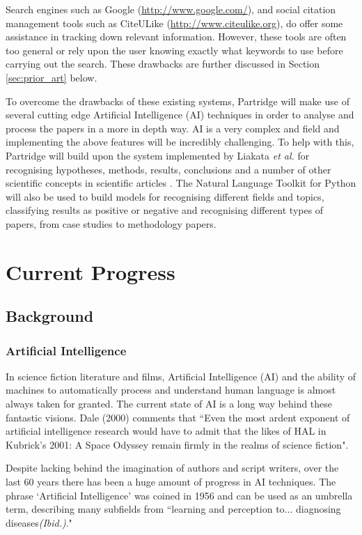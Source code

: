 \documentclass[12pt,a4paper]{article}
\begin{document}
Search engines such as Google ({\url{http://www.google.com/}}), and social
citation management tools such as CiteULike ({\url{http://www.citeulike.org}}),
do offer some assistance in tracking down relevant information. However, these
tools are often too general or rely upon the user knowing exactly what keywords
to use before carrying out the search. These drawbacks are further discussed in 
Section \ref{sec:prior_art} below.

To overcome the drawbacks of these existing systems, Partridge will make use of
several cutting edge Artificial Intelligence (AI) techniques in order to analyse and
process the papers in a more in depth way. AI is a very complex and field and
implementing the above features will be incredibly challenging. To help with
this, Partridge will build upon the system implemented by Liakata \emph{et al.} for
recognising hypotheses, methods, results, conclusions and a number of other
scientific concepts in scientific articles \cite{citeulike:10444769}. The
Natural Language Toolkit for Python will also be used to build models for
recognising different fields and topics, classifying results as positive or
negative and recognising different types of papers, from case studies to
methodology papers\cite{bird2009natural}.

\section{Current Progress}

\subsection{Background}

\subsubsection{Artificial Intelligence}
In science fiction literature and films, Artificial Intelligence (AI) and the
ability of machines to automatically process and understand human language is
almost always taken for granted. The current state of AI is a long way behind these
fantastic visions. Dale (2000) comments that ``Even the most ardent exponent of
artificial intelligence research would have to admit that the likes of HAL in
Kubrick's 2001: A Space Odyssey remain firmly in the realms of science
fiction\cite{dale2000handbook}".

Despite lacking behind the imagination of authors and script writers, over the last 60 years there
has been a huge amount of progress in AI techniques. The phrase `Artificial
Intelligence' was coined in 1956\cite{russell2010artificial} and can be used as
an umbrella term, describing many subfields from ``learning and perception
to... diagnosing diseases\emph{(Ibid.)}."
\end{document}
